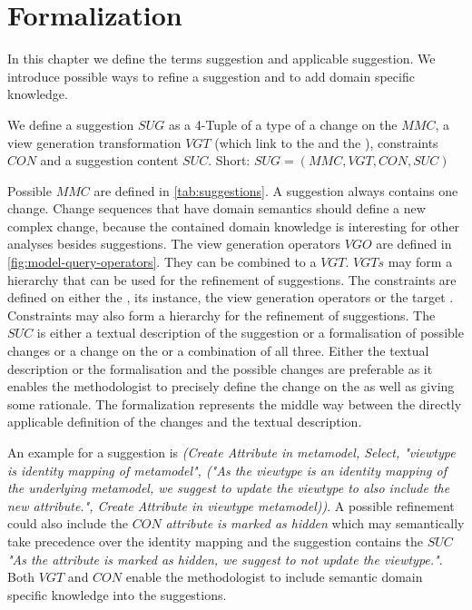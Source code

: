 \section{Formalization}
\label{sec:Formalization}
In this chapter we define the terms suggestion and applicable suggestion. We introduce possible ways to refine a suggestion and to add domain specific knowledge.

\begin{definition}[Suggestion]
We define a suggestion $SUG$ as a 4-Tuple of a type of a change on the \metamodel $MMC$, a view generation transformation $VGT$ (which link to the \metamodel and the \viewtype),  constraints $CON$ and a suggestion content $SUC$. Short: $SUG = (MMC, VGT, CON, SUC)$
\end{definition}
Possible $MMC$ are defined in \cref{tab:suggestions}. A suggestion always contains one change. Change sequences that have domain semantics should define a new complex change, because the contained domain knowledge is interesting for other analyses besides suggestions. The view generation operators $VGO$ are defined in \cref{fig:model-query-operators}. They can be combined to a $VGT$. $VGTs$ may form a hierarchy that can be used for the refinement of suggestions. The constraints are defined on either the \metamodel, its instance, the view generation operators or the target \metamodel. Constraints may also form a hierarchy for the refinement of suggestions. The $SUC$ is either a textual description of the suggestion or a formalisation of possible changes or a change on the \viewtype or a combination of all three. Either the textual description or the formalisation and the possible changes are preferable as it enables the methodologist to precisely define the change on the \viewtype \metamodel as well as giving some rationale. The formalization represents the middle way between the directly applicable definition of the changes and the textual description.

An example for a suggestion is \textit{(Create Attribute in metamodel, Select,  "viewtype is identity mapping of metamodel", ("As the viewtype is an identity mapping of the underlying metamodel, we suggest to update the viewtype to also include the new attribute.", Create Attribute in viewtype metamodel))}. A possible refinement could also include the $CON$ \textit{attribute is marked as hidden} which may semantically take precedence over the identity mapping and the suggestion contains the $SUC$ \textit{"As the attribute is marked as hidden, we suggest to not update the viewtype."}. Both $VGT$ and $CON$ enable the methodologist to include semantic domain specific knowledge into the suggestions.